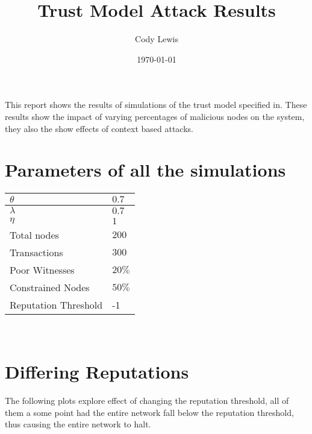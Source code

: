 \documentclass{article}
\title{Trust Model Attack Results}
\author{Cody Lewis}
\date{\today}
\begin{document}
  \maketitle
  This report shows the results of simulations of the trust model specified
  in\cite{saied13}. These results show the impact of varying percentages of
  malicious nodes on the system, they also the show effects of context based
  attacks.
  \section*{Parameters of all the simulations}
    \begin{tabularx}{\textwidth}{X X}
        \toprule
        $ \theta{} $ & $ 0.7 $ \\
        \midrule
        $ \lambda{} $ & $ 0.7 $ \\
        \midrule
        $ \eta{} $ & $ 1 $ \\
        \midrule
        Total nodes & $ 200 $ \\
        \midrule
        Transactions & $ 300 $ \\
        \midrule
        Poor Witnesses & $ 20\% $ \\
        \midrule
        Constrained Nodes & $ 50\% $ \\
        \midrule
        Reputation Threshold & -1 \\
        \bottomrule
    \end{tabularx} \\

    

    \section*{Differing Reputations}
    The following plots explore effect of changing the reputation threshold,
    all of them a some point had the entire network fall below the reputation
    threshold, thus causing the entire network to halt.
\end{document}

